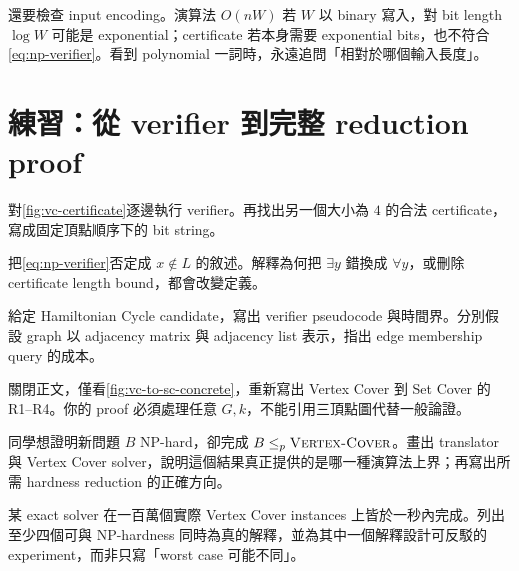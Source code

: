 \documentclass[11pt,a4paper,oneside,openany]{book}
\begin{document}
還要檢查 input encoding。演算法 $O(nW)$ 若 $W$ 以 binary 寫入，對 bit length $\log W$ 可能是 exponential；certificate 若本身需要 exponential bits，也不符合\cref{eq:np-verifier}。看到 polynomial 一詞時，永遠追問「相對於哪個輸入長度」。

\section{練習：從 verifier 到完整 reduction proof}
\begin{exercise}
對\cref{fig:vc-certificate}逐邊執行 verifier。再找出另一個大小為 $4$ 的合法 certificate，寫成固定頂點順序下的 bit string。
\end{exercise}

\begin{exercise}
把\cref{eq:np-verifier}否定成 $x\notin L$ 的敘述。解釋為何把 $\exists y$ 錯換成 $\forall y$，或刪除 certificate length bound，都會改變定義。
\end{exercise}

\begin{exercise}
給定 Hamiltonian Cycle candidate，寫出 verifier pseudocode 與時間界。分別假設 graph 以 adjacency matrix 與 adjacency list 表示，指出 edge membership query 的成本。
\end{exercise}

\begin{exercise}
\label{ex:vc-sc-reduction}
關閉正文，僅看\cref{fig:vc-to-sc-concrete}，重新寫出 Vertex Cover 到 Set Cover 的 R1--R4。你的 proof 必須處理任意 $G,k$，不能引用三頂點圖代替一般論證。
\end{exercise}

\begin{exercise}
同學想證明新問題 $B$ NP-hard，卻完成 $B\le_p\textsc{Vertex-Cover}$。畫出 translator 與 Vertex Cover solver，說明這個結果真正提供的是哪一種演算法上界；再寫出所需 hardness reduction 的正確方向。
\end{exercise}

\begin{exercise}
某 exact solver 在一百萬個實際 Vertex Cover instances 上皆於一秒內完成。列出至少四個可與 NP-hardness 同時為真的解釋，並為其中一個解釋設計可反駁的 experiment，而非只寫「worst case 可能不同」。
\end{exercise}
\end{document}
